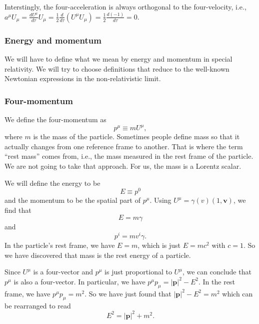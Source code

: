 \documentclass{article}
\begin{document}
Interstingly, the four-acceleration is always orthogonal to the four-velocity, i.e., $ a^\mu U_\mu = \frac{dU^\mu }{ d \tau} U_\mu = \frac{1}{2} \frac{d}{d \tau} (U^\mu U_\mu) = \frac{1}{2} \frac{d(-1)}{d \tau} = 0$.

\subsubsection*{Energy and momentum}

We will have to define what we mean by energy and momentum in special relativity. We will try to choose definitions that reduce to the well-known Newtonian expressions in the non-relativistic limit.

\subsubsection*{Four-momentum}

We define the four-momentum as \begin{equation} p^\mu \equiv m U^\mu , \end{equation} where $m$ is the mass of the particle. Sometimes people define mass so that it actually changes from one reference frame to another. That is where the term ``rest mass'' comes from, i.e., the mass measured in the rest frame of the particle. We are not going to take that approach. For us, the mass is a Lorentz scalar.

We will define the energy to be \begin{equation} E \equiv p^0 \end{equation} and the momentum to be the spatial part of $p^\mu$. Using $ U^\mu = \gamma(v) (1,\mathbf{v}) $, we find that \begin{equation} E = m \gamma \end{equation} and \begin{equation} p^i = m v^i \gamma . \end{equation} In the particle's rest frame, we have $E = m$, which is just $E = m c^2$ with $c = 1$. So we have discovered that mass is the rest energy of a particle.

Since $U^\mu$ is a four-vector and $p^\mu$ is just proportional to $U^\mu$, we can conclude that $p^\mu$ is also a four-vector. In particular, we have $ p^\mu p_\mu = |\mathbf{p}|^2 - E^2$.  In the rest frame, we have $p^\mu p_\mu = m^2$. So we have just found that $|\mathbf{p}|^2 - E^2 = m^2$ which can be rearranged to read \begin{equation} E^2 = |\mathbf{p}|^2 + m^2 . \end{equation}
\end{document}
